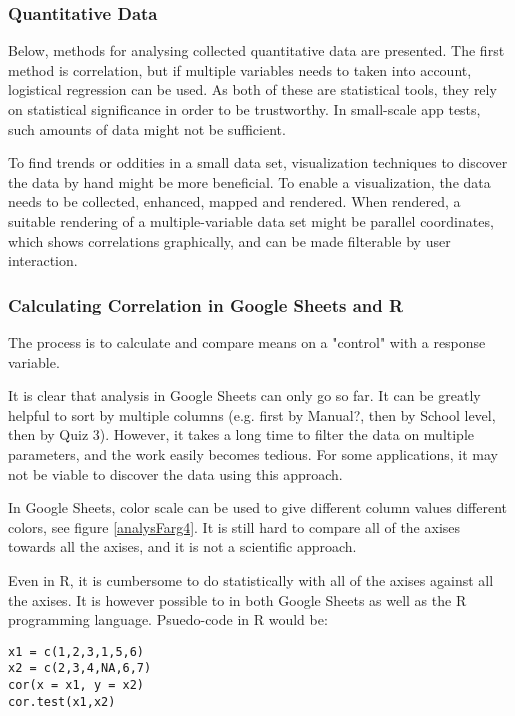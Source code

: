\subsubsection{Quantitative Data}
Below, methods for analysing collected quantitative data are presented. The first method is correlation, but if multiple variables needs to taken into account, logistical regression can be used. As both of these are statistical tools, they rely on statistical significance in order to be trustworthy. In small-scale app tests, such amounts of data might not be sufficient.

To find trends or oddities in a small data set, visualization techniques to discover the data by hand might be more beneficial. To enable a visualization, the data needs to be collected, enhanced, mapped and rendered. When rendered, a suitable rendering of a multiple-variable data set might be parallel coordinates, which shows correlations graphically, and can be made filterable by user interaction.

\subsubsection{Calculating Correlation in Google Sheets and R}

The process is to calculate and compare means on a "control"  with a response variable.

It is clear that analysis in Google Sheets can only go so far. It can be greatly helpful to sort by multiple columns (e.g. first by Manual?, then by School level, then by Quiz 3). However, it takes a long time to filter the data on multiple parameters, and the work easily becomes tedious. For some applications, it may not be viable to discover the data using this approach.

In Google Sheets, color scale can be used to give different column values different colors, see figure \ref{analysFarg4}. It is still hard to compare all of the axises towards all the axises, and it is not a scientific approach.

Even in R, it is cumbersome to do statistically with all of the axises against all the axises. It is however possible to in both Google Sheets as well as the R programming language. Psuedo-code in R would be:

\begin{verbatim}
x1 = c(1,2,3,1,5,6)
x2 = c(2,3,4,NA,6,7)
cor(x = x1, y = x2)
cor.test(x1,x2)
\end{verbatim}

